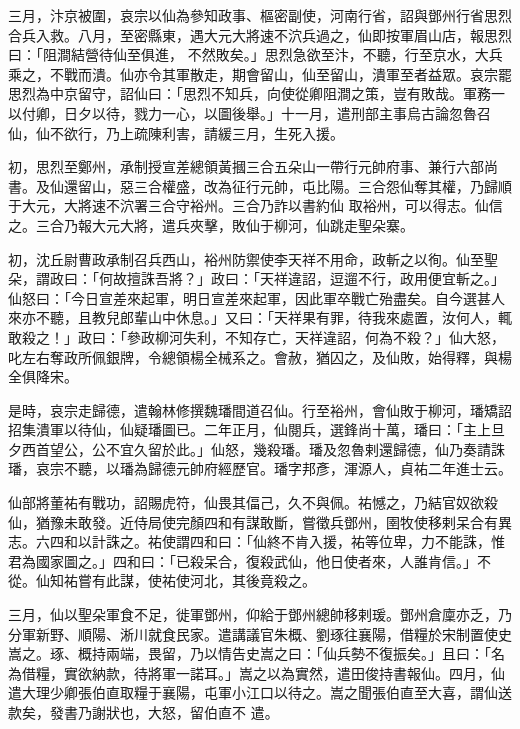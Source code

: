 \begin{pinyinscope}
 三月，汴京被圍，哀宗以仙為參知政事、樞密副使，河南行省，詔與鄧州行省思烈合兵入救。八月，至密縣東，遇大元大將速不泬兵過之，仙即按軍眉山店，報思烈曰：「阻澗結營待仙至俱進，
 不然敗矣。」思烈急欲至汴，不聽，行至京水，大兵乘之，不戰而潰。仙亦令其軍散走，期會留山，仙至留山，潰軍至者益眾。哀宗罷思烈為中京留守，詔仙曰：「思烈不知兵，向使從卿阻澗之策，豈有敗哉。軍務一以付卿，日夕以待，戮力一心，以圖後舉。」十一月，遣刑部主事烏古論忽魯召仙，仙不欲行，乃上疏陳利害，請緩三月，生死入援。



 初，思烈至鄭州，承制授宣差總領黃摑三合五朵山一帶行元帥府事、兼行六部尚書。及仙還留山，惡三合權盛，改為征行元帥，屯比陽。三合怨仙奪其權，乃歸順于大元，大將速不泬署三合守裕州。三合乃詐以書約仙
 取裕州，可以得志。仙信之。三合乃報大元大將，遣兵夾擊，敗仙于柳河，仙跳走聖朵寨。



 初，沈丘尉曹政承制召兵西山，裕州防禦使李天祥不用命，政斬之以徇。仙至聖朵，謂政曰：「何故擅誅吾將？」政曰：「天祥違詔，逗遛不行，政用便宜斬之。」仙怒曰：「今日宣差來起軍，明日宣差來起軍，因此軍卒戰亡殆盡矣。自今選甚人來亦不聽，且教兒郎輩山中休息。」又曰：「天祥果有罪，待我來處置，汝何人，輒敢殺之！」政曰：「參政柳河失利，不知存亡，天祥違詔，何為不殺？」仙大怒，叱左右奪政所佩銀牌，令總領楊全械系之。會赦，猶囚之，及仙敗，始得釋，與楊全俱降宋。



 是時，哀宗走歸德，遣翰林修撰魏璠間道召仙。行至裕州，會仙敗于柳河，璠矯詔招集潰軍以待仙，仙疑璠圖已。二年正月，仙閱兵，選鋒尚十萬，璠曰：「主上旦夕西首望公，公不宜久留於此。」仙怒，幾殺璠。璠及忽魯剌還歸德，仙乃奏請誅璠，哀宗不聽，以璠為歸德元帥府經歷官。璠字邦彥，渾源人，貞祐二年進士云。



 仙部將董祐有戰功，詔賜虎符，仙畏其偪己，久不與佩。祐憾之，乃結官奴欲殺仙，猶豫未敢發。近侍局使完顏四和有謀敢斷，嘗徵兵鄧州，圉牧使移剌呆合有異志。六四和以計誅之。祐使謂四和曰：「仙終不肯入援，祐等位卑，力不能誅，惟
 君為國家圖之。」四和曰：「已殺呆合，復殺武仙，他日使者來，人誰肯信。」不從。仙知祐嘗有此謀，使祐使河北，其後竟殺之。



 三月，仙以聖朵軍食不足，徙軍鄧州，仰給于鄧州總帥移剌瑗。鄧州倉廩亦乏，乃分軍新野、順陽、淅川就食民家。遣講議官朱概、劉琢往襄陽，借糧於宋制置使史嵩之。琢、概持兩端，畏留，乃以情告史嵩之曰：「仙兵勢不復振矣。」且曰：「名為借糧，實欲納款，待將軍一諾耳。」嵩之以為實然，遣田俊持書報仙。四月，仙遣大理少卿張伯直取糧于襄陽，屯軍小江口以待之。嵩之聞張伯直至大喜，謂仙送款矣，發書乃謝狀也，大怒，留伯直不
 遣。




\end{pinyinscope}

